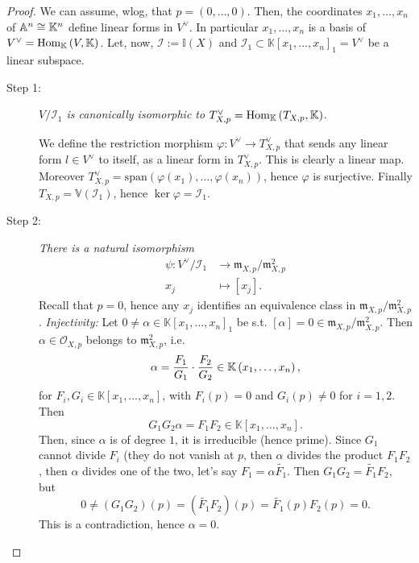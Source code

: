 \begin{proof}
	We can assume, wlog, that $p = \left( 0, \ldots, 0 \right)$.
Then, the coordinates $x_1, \ldots, x_n$ of $\mathbb{A}^{n} \cong \mathbb{K}^n$ define linear forms in $V^{\vee}$.
In particular $x_1, \ldots, x_n$ is a basis of $V^{\vee} = \mathrm{Hom}_{\mathbb{K}}\left( V, \mathbb{K} \right)$.
Let, now, $\mathcal{I} := \mathbb{I}(X)$ and $\mathcal{I}_1 \subset \mathbb{K}\left[x_1, \ldots, x_n \right]_1 = V^{\vee}$
be a linear subspace.
\begin{description}
	\item[Step 1:] \textit{$V/\mathcal{I}_1$ is canonically isomorphic to
		$T^{\vee}_{X,p} = \mathrm{Hom}_{\mathbb{K}}\left( T_{X,p}, \mathbb{K} \right)$}.

		We define the restriction morphism $\varphi: V^{\vee} \to T_{X,p}^{\vee}$
		that sends any linear form $l \in V^{\vee}$ to itself, as a linear form in $T^{\vee}_{X,p}$.
		This is clearly a linear map.
		Moreover $T^{\vee}_{X,p} = \mathrm{span} \left( \varphi(x_1), \ldots, \varphi(x_n) \right)$, 
		hence $\varphi$ is surjective.
		Finally $T_{X,p} = \mathbb{V}\left( \mathcal{I}_1 \right)$, hence
		$\ker \varphi = \mathcal{I}_1$.

	\item[Step 2:] \textit{There is a natural isomorphism}
		\begin{align}
			\psi: V^{\vee} / \mathcal{I}_1 &\to \mathfrak{m}_{X,p}/\mathfrak{m}^2_{X,p} \\
			x_j &\mapsto [x_j]
		.\end{align} 
		Recall that $p = 0$, hence any $x_j$ identifies an equivalence class in $\mathfrak{m}_{X,p}/\mathfrak{m}^2_{X,p}$.
		\textit{Injectivity:} Let $0 \neq \alpha \in \mathbb{K}\left[x_1, \ldots, x_n \right]_1$ be 
		s.t. $[\alpha] = 0 \in \mathfrak{m}_{X,p}/\mathfrak{m}^2_{X,p}$.
		Then $\alpha \in \mathcal{O}_{X,p}$ belongs to $\mathfrak{m}^2_{X,p}$, i.e.
		\begin{equation}
			\alpha = \frac{F_1}{G_1} \cdot \frac{F_2}{G_2} \in \mathbb{K} \left( x_1, \ldots, x_n \right)
		,\end{equation} 
		for $F_i, G_i \in \mathbb{K}\left[x_1, \ldots, x_n \right]$,
		with $F_i(p) = 0$ and $G_i(p) \neq 0$ for $i = 1,2$.
		Then
		\begin{equation}
		G_1G_2 \alpha = F_1F_2 \in \mathbb{K}\left[x_1, \ldots, x_n \right]
		.\end{equation} 
		Then, since $\alpha$ is of degree $1$, it is irreducible (hence prime).
		Since $G_1$ cannot divide $F_i$ (they do not vanish at $p$, then $\alpha$ divides the product $F_1F_2$,
		then $\alpha$ divides one of the two, let's say $F_1 = \alpha \widetilde{F_1}$.
		Then $G_1G_2 = \widetilde{F_1}F_2$, but
		\begin{equation}
			0 \neq \left( G_1G_2 \right)(p) = \left( \widetilde{F_1}F_2 \right)(p) = 
			\widetilde{F_1}(p) F_2(p) = 0
		.\end{equation} 
		This is a contradiction, hence $\alpha = 0$.


\end{description}
\end{proof}
